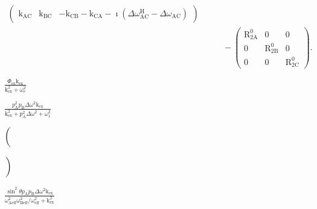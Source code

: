 \documentclass[a4paper,11pt,twoside,openright]{book}
\def\lthtmlcheckvsize{\ifdim\ht\sizebox<\vsize 
  \ifdim\wd\sizebox<\hsize\expandafter\hfill\fi \expandafter\vfill
  \else\expandafter\vss\fi}%
\begin{document}
{\begin{subequations}
\begin{align}
\begin{pmatrix}
\textrm{k}_{\textrm{AC}}& \textrm{k}_{\textrm{BC}}& -\textrm{k}_{\textrm{CB}}-\textrm{k}_{\textrm{CA}}-\imath(\Delta\omega^{\scriptscriptstyle\mathrm{H}}_{\textrm{AC}}- \Delta\omega_{\textrm{AC}})
\end{pmatrix}  \nonumber \\
&\qquad - \begin{pmatrix}
\mathrm{R}_{\mathrm{2A}}^0& 0          & 0    \\
0          & \mathrm{R}_{\mathrm{2B}}^0& 0    \\
0          & 0          & \mathrm{R}_{\mathrm{2C}}^0
\end{pmatrix}.
\end{align}\end{subequations}%
\lthtmldisplayZ
\lthtmlcheckvsize\clearpage}

{\newpage\clearpage
{}%
$\displaystyle {\frac{{\Phi_{\textrm{ex}}\textrm{k}_{\textrm{ex}}}}{{\textrm{k}_{\textrm{ex}}^2 + \omega_{\textrm{e}}^2}}}$%
\lthtmlindisplaymathZ
\lthtmlcheckvsize\clearpage}

{\newpage\clearpage
{}%
$\displaystyle {\frac{{p_{\textrm{A}}^2p_{\textrm{B}}\Delta\omega ^2\textrm{k}_{\textrm{ex}}}}{{\textrm{k}_{\textrm{ex}}^2 + p_{\textrm{A}}^2\Delta\omega ^2 + \omega_1 ^2}}}$%
\lthtmlindisplaymathZ
\lthtmlcheckvsize\clearpage}

{\newpage\clearpage
{}%
$\displaystyle \left(\vphantom{ \mathrm{R}_{1\rho}'+ \frac{\Phi_{\textrm{ex}}\textrm{k}_{\textrm{ex}}}{\textrm{k}_{\textrm{ex}}^2 + \omega_{\textrm{e}}^2} }\right.$%
\lthtmlindisplaymathZ
\lthtmlcheckvsize\clearpage}

{\newpage\clearpage
{}%
$\displaystyle \left.\vphantom{ \mathrm{R}_{1\rho}'+ \frac{\Phi_{\textrm{ex}}\textrm{k}_{\textrm{ex}}}{\textrm{k}_{\textrm{ex}}^2 + \omega_{\textrm{e}}^2} }\right)$%
\lthtmlindisplaymathZ
\lthtmlcheckvsize\clearpage}

{\newpage\clearpage
{}%
$\displaystyle {\frac{{\sin^2\theta p_{\textrm{A}}p_{\textrm{B}}\Delta\omega ^2\textrm{k}_{\textrm{ex}}}}{{\omega_{\textrm{Aeff}}^2\omega_{\textrm{Beff}}^2/\omega_{\textrm{eff}}^2 + \textrm{k}_{\textrm{ex}}^2}}}$%
\lthtmlindisplaymathZ
\lthtmlcheckvsize\clearpage}
\end{document}
